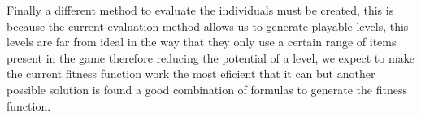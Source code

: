\documentclass[conference]{IEEEtran}
\begin{document}
    Finally a different method to evaluate the individuals must be created, this is
    because the current evaluation method allows us to generate playable levels,
    this levels are far from ideal in the way that they only use a certain range of
    items present in the game therefore reducing the potential of a level, we expect
    to make the current fitness function work the most eficient that it can but
    another possible solution is found a good combination of formulas to generate
    the fitness function.



\end{document}
